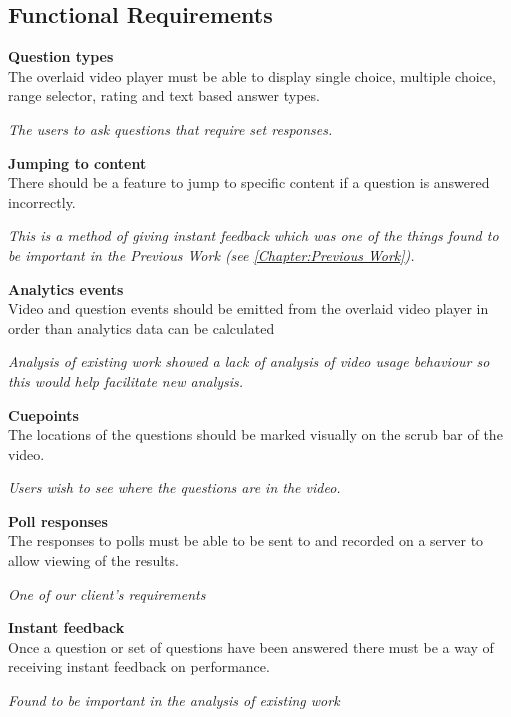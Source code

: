\subsection{Functional Requirements}
\begin{requirement}[label=\textbf{F\arabic*}]
\item \textbf{Question types}  \label{Req:Question types} \hfill \\
The overlaid video player must be able to display single choice, multiple choice, range selector, rating and text based answer types.

\textit{The users to ask questions that require set responses.}
\item \textbf{Jumping to content} \label{Req:Jumping to content} \hfill \\ 
There should be a feature to jump to specific content if a question is answered incorrectly.

\textit{This is a method of giving instant feedback which was one of the things found to be important in the Previous Work (see \autoref{Chapter:Previous Work}).}
\item \textbf{Analytics events} \label{Req:Analytics events} \hfill \\ 
Video and question events should be emitted from the overlaid video player in order than analytics data can be calculated 

\textit{Analysis of existing work showed a lack of analysis of video usage behaviour so this would help facilitate new analysis.}
\item \textbf{Cuepoints} \label{Req:Cuepoints} \hfill \\ The locations of the questions should be marked visually on the scrub bar of the video.

\textit{Users wish to see where the questions are in the video.}
\item \textbf{Poll responses} \label{Req:Poll responses} \hfill \\ The responses to polls must be able to be sent to and recorded on a server to allow viewing of the results.

\textit{One of our client's requirements}
\item \textbf{Instant feedback} \label{Req:Instant feedback} \hfill \\ Once a question or set of questions have been answered there must be a way of receiving instant feedback on performance.

\textit{Found to be important in the analysis of existing work}
\end{requirement}

